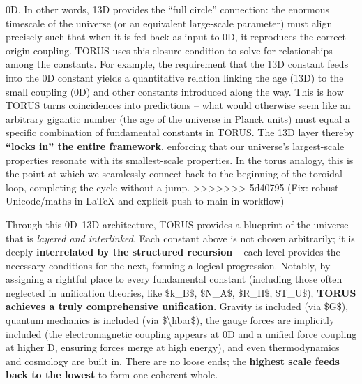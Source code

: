 \documentclass[]{article}
\begin{document}
\begin{itemize}
  0D. In other words, 13D provides the ``full circle'' connection: the
  enormous timescale of the universe (or an equivalent large-scale
  parameter) must align precisely such that when it is fed back as input
  to 0D, it reproduces the correct origin coupling. TORUS uses this
  closure condition to solve for relationships among the constants. For
  example, the requirement that the 13D constant feeds into the 0D
  constant yields a quantitative relation linking the age (13D) to the
  small coupling (0D) and other constants introduced along the way​.
  This is how TORUS turns coincidences into predictions -- what would
  otherwise seem like an arbitrary gigantic number (the age of the
  universe in Planck units) must equal a specific combination of
  fundamental constants in TORUS. The 13D layer thereby \textbf{``locks
  in'' the entire framework}, enforcing that our universe's
  largest-scale properties resonate with its smallest-scale properties.
  In the torus analogy, this is the point at which we seamlessly connect
  back to the beginning of the toroidal loop, completing the cycle
  without a jump.
>>>>>>> 5d40795 (Fix: robust Unicode/maths in LaTeX and explicit push to main in workflow)
\end{itemize}

Through this 0D--13D architecture, TORUS provides a blueprint of the
universe that is \emph{layered and interlinked}. Each constant above is
not chosen arbitrarily; it is deeply \textbf{interrelated by the
structured recursion} -- each level provides the necessary conditions
for the next, forming a logical progression. Notably, by assigning a
rightful place to every fundamental constant (including those often
neglected in unification theories, like \$k\_B\$, \$N\_A\$, \$R\_H\$,
\$T\_U\$), \textbf{TORUS achieves a truly comprehensive unification}​.
Gravity is included (via \$G\$), quantum mechanics is included (via
\$\textbackslash{}hbar\$), the gauge forces are implicitly included (the
electromagnetic coupling appears at 0D and a unified force coupling at
higher D, ensuring forces merge at high energy), and even thermodynamics
and cosmology are built in. There are no loose ends; the \textbf{highest
scale feeds back to the lowest} to form one coherent whole​.
\end{document}
